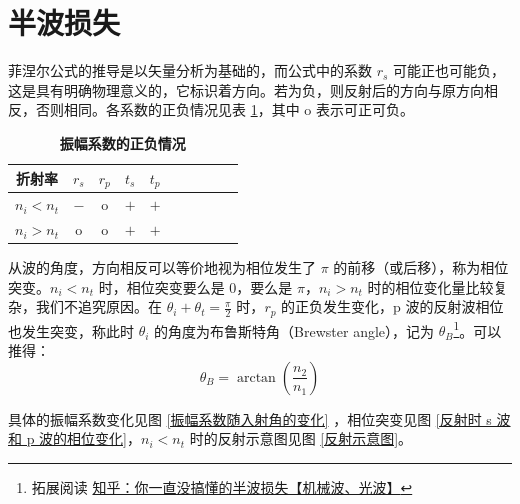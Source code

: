 \documentclass[UTF8]{report}
\theoremstyle{MyLineTheoremStyle} %
\theoremstyle{MyBlockTheoremStyle} %
\theoremstyle{MySubsubsectionStyle} %
\begin{document}
\section{半波损失}

菲涅尔公式的推导是以矢量分析为基础的，而公式中的系数 $r_s$ 可能正也可能负，这是具有明确物理意义的，它标识着方向。若为负，则反射后的方向与原方向相反，否则相同。各系数的正负情况见表 \ref{振幅系数的正负情况}，其中 o 表示可正可负。

\begin{table}[H]\centering
        \caption{\textbf{振幅系数的正负情况}}
        \label{振幅系数的正负情况}
    \begin{tabular}{cccccccccc}\toprule
        折射率 & $r_s$& $r_p$ & $t_s$ & $t_p$\\
        \midrule                        
        $n_i < n_t$ & $-$ & o & $+$ & $+$\\
        $n_i > n_t$ & o & o & $+$ & $+$\\
        \bottomrule
    \end{tabular}
\end{table}

从波的角度，方向相反可以等价地视为相位发生了 $\pi$ 的前移（或后移），称为相位突变。$n_i < n_t$ 时，相位突变要么是 0，要么是 $\pi$，$n_i > n_t$ 时的相位变化量比较复杂，我们不追究原因。在 $\theta_i + \theta_t = \frac{\pi}{2}$ 时，$r_p$ 的正负发生变化，p 波的反射波相位也发生突变，称此时 $\theta_i$ 的角度为布鲁斯特角（Brewster angle），记为 $\theta_B$\footnote{拓展阅读 \href{https://zhuanlan.zhihu.com/p/607510257}{知乎：你一直没搞懂的半波损失【机械波、光波】}}。可以推得：
\begin{equation}
\theta_B = \arctan \left( \frac{n_2}{n_1} \right)
\end{equation}

具体的振幅系数变化见图 \ref{振幅系数随入射角的变化} ，相位突变见图 \ref{反射时 s 波和 p 波的相位变化}，$n_i < n_t$ 时的反射示意图见图 \ref{反射示意图}。
\end{document}
